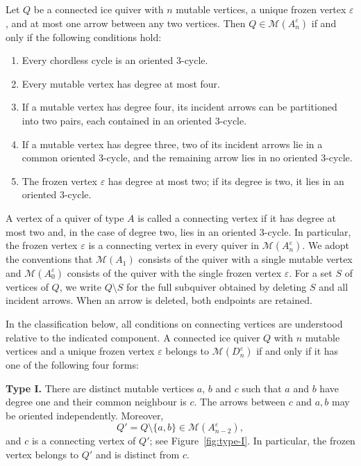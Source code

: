 \documentclass[a4paper, 12pt, reqno]{amsart}
\theoremstyle{definition}
\begin{document}
Let $Q$ be a connected ice quiver with $n$ mutable vertices, a unique frozen vertex $\varepsilon$, and at most one arrow between any two vertices. Then $Q\in\mathcal{M}(A_n^\varepsilon)$ if and only if the following conditions hold:
\begin{enumerate}
  \item[(1)] Every chordless cycle is an oriented $3$-cycle.

  \item[(2)] Every mutable vertex has degree at most four.

  \item[(3)] If a mutable vertex has degree four, its incident arrows can be partitioned into two pairs, each contained in an oriented $3$-cycle.

  \item[(4)] If a mutable vertex has degree three, two of its incident arrows lie in a common oriented $3$-cycle, and the remaining arrow lies in no oriented $3$-cycle.

  \item[(5)] The frozen vertex $\varepsilon$ has degree at most two; if its degree is two, it lies in an oriented $3$-cycle.
\end{enumerate}




A vertex of a quiver of type $A$ is called a connecting vertex if it has degree at most two and, in the case of degree two, lies in an oriented $3$-cycle. In particular, the frozen vertex $\varepsilon$ is a connecting vertex in every quiver in $\mathcal{M}(A_n^\varepsilon)$. We adopt the conventions that $\mathcal{M}(A_1)$ consists of the quiver with a single mutable vertex and $\mathcal{M}(A_0^\varepsilon)$ consists of the quiver with the single frozen vertex $\varepsilon$. For a set $S$ of vertices of $Q$, we write $Q\setminus S$ for the full subquiver obtained by deleting $S$ and all incident arrows. When an arrow is deleted, both endpoints are retained.

In the classification below, all conditions on connecting vertices are understood relative to the indicated component. A connected ice quiver $Q$ with $n$ mutable vertices and a unique frozen vertex $\varepsilon$ belongs to $\mathcal{M}(D_n^\varepsilon)$ if and only if it has one of the following four forms:


\medskip
\noindent\textbf{Type I.}
There are distinct mutable vertices $a$, $b$ and $c$ such that $a$ and $b$ have degree one and their common neighbour is $c$. The arrows between $c$ and $a,b$ may be oriented independently. Moreover,
\[
Q'=Q\setminus\{a,b\}\in\mathcal{M}(A_{n-2}^\varepsilon),
\]
and $c$ is a connecting vertex of $Q'$; see Figure~\ref{fig:type-I}. In particular, the frozen vertex belongs to $Q'$ and is distinct from $c$.
\end{document}
